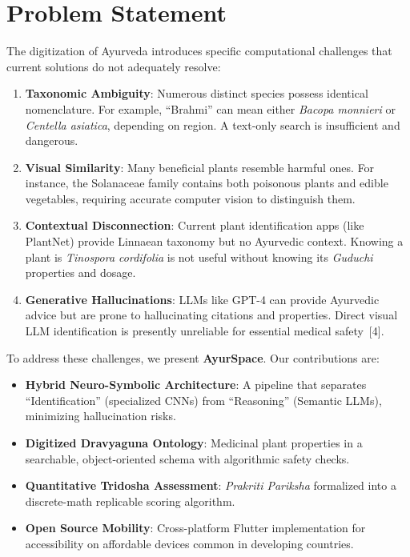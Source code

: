 \section{Problem Statement}
\justify
The digitization of Ayurveda introduces specific computational challenges that current
solutions do not adequately resolve:
\begin{enumerate}[label={\textbf{\arabic*.}}, leftmargin=*]
    \item \textbf{Taxonomic Ambiguity}: Numerous distinct species possess identical
    nomenclature. For example, ``Brahmi'' can mean either \textit{Bacopa monnieri} or
    \textit{Centella asiatica}, depending on region. A text-only search is insufficient
    and dangerous.

    \item \textbf{Visual Similarity}: Many beneficial plants resemble harmful ones.
    For instance, the Solanaceae family contains both poisonous plants and edible
    vegetables, requiring accurate computer vision to distinguish them.

    \item \textbf{Contextual Disconnection}: Current plant identification apps (like
    PlantNet) provide Linnaean taxonomy but no Ayurvedic context. Knowing a plant is
    \textit{Tinospora cordifolia} is not useful without knowing its \textit{Guduchi}
    properties and dosage.

    \item \textbf{Generative Hallucinations}: LLMs like GPT-4 can provide Ayurvedic
    advice but are prone to hallucinating citations and properties. Direct visual LLM
    identification is presently unreliable for essential medical safety~[4].
\end{enumerate}

To address these challenges, we present \textbf{AyurSpace}. Our contributions are:
\begin{itemize}
    \item \textbf{Hybrid Neuro-Symbolic Architecture}: A pipeline that separates
    ``Identification'' (specialized CNNs) from ``Reasoning'' (Semantic LLMs), minimizing
    hallucination risks.
    \item \textbf{Digitized Dravyaguna Ontology}: Medicinal plant properties in a
    searchable, object-oriented schema with algorithmic safety checks.
    \item \textbf{Quantitative Tridosha Assessment}: \textit{Prakriti Pariksha}
    formalized into a discrete-math replicable scoring algorithm.
    \item \textbf{Open Source Mobility}: Cross-platform Flutter implementation for
    accessibility on affordable devices common in developing countries.
\end{itemize}

